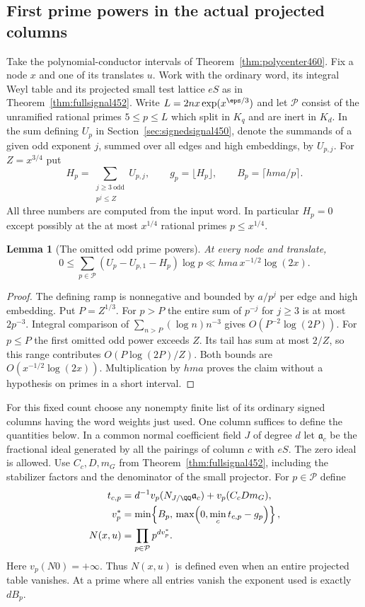 \documentclass[a4paper,11pt]{article}
\newtheorem{lemma}[proposition]{Lemma}
\theoremstyle{definition}
\theoremstyle{remark}
\numberwithin{equation}{section}
\begin{document}
\subsection{First prime powers in the actual projected columns}
\label{sec:firstpowers668}

Take the polynomial-conductor intervals of
Theorem~\ref{thm:polycenter460}. Fix a node \(x\) and one of its
translates \(u\). Work with the ordinary word, its integral Weyl
table and its projected small test lattice \(eS\) as in
Theorem~\ref{thm:fullsignal452}. Write \(L=2nx\exp(x^{\eps/3})\)
and let \(\mathcal P\) consist of the unramified rational primes
\(5\le p\le L\) which split in \(K_q\) and are inert in \(K_d\).
In the sum defining \(U_p\) in Section~\ref{sec:signedsignal450},
denote the summands of a given odd exponent \(j\), summed over
all edges and high embeddings, by \(U_{p,j}\). For \(Z=x^{3/4}\)
put
\[
 H_p=\sum_{\substack{j\ge3\ \mathrm{odd}\\p^j\le Z}}U_{p,j},
 \qquad g_p=\lfloor H_p\rfloor,\qquad
 B_p=\lceil hma/p\rceil .
\]
All three numbers are computed from the input word. In particular
\(H_p=0\) except possibly at the at most \(x^{1/4}\) rational
primes \(p\le x^{1/4}\).

\begin{lemma}[The omitted odd prime powers]
\leavevmode\label{lem:higherpowers668}
At every node and translate,
\[
 0\le \sum_{p\in\mathcal P}(U_p-U_{p,1}-H_p)\log p
     \ll hma\,x^{-1/2}\log(2x).
\]
\end{lemma}
\begin{proof}
The defining ramp is nonnegative and bounded by \(a/p^j\)
per edge and high embedding. Put \(P=Z^{1/3}\). For \(p>P\)
the entire sum of \(p^{-j}\) for \(j\ge3\) is at most \(2p^{-3}\).
Integral comparison of \(\sum_{n>P}(\log n)n^{-3}\) gives
\(O(P^{-2}\log(2P))\). For \(p\le P\) the first omitted odd
power exceeds \(Z\). Its tail has sum at most \(2/Z\), so this
range contributes \(O(P\log(2P)/Z)\). Both bounds are
\(O(x^{-1/2}\log(2x))\). Multiplication by \(hma\) proves the
claim without a hypothesis on primes in a short interval.
\end{proof}

For this fixed count choose any nonempty finite list of its
ordinary signed columns having the word weights just used.
One column suffices to define the quantities below. In a common
normal coefficient field \(J\) of degree \(d\) let
\(\mathfrak a_c\) be the fractional ideal generated by all
the pairings of column \(c\) with \(eS\). The zero ideal is allowed.
Use \(C_c,D,m_G\) from Theorem~\ref{thm:fullsignal452}, including
the stabilizer factors and the denominator of the small projector.
For \(p\in\mathcal P\) define
\[
 \begin{split}
 t_{c,p}&=d^{-1}v_p(N_{J/\QQ}\mathfrak a_c)+v_p(C_cDm_G),\\
 v_p^*&=\min\!\left\{B_p,\,
              \max\!\left(0,\min_c t_{c,p}-g_p\right)\right\},\\
 N(x,u)&=\prod_{p\in\mathcal P}p^{d v_p^*}.
 \end{split}
\]
Here \(v_p(N0)=+\infty\). Thus \(N(x,u)\) is defined even when
an entire projected table vanishes. At a prime where all entries
vanish the exponent used is exactly \(dB_p\).
\end{document}
